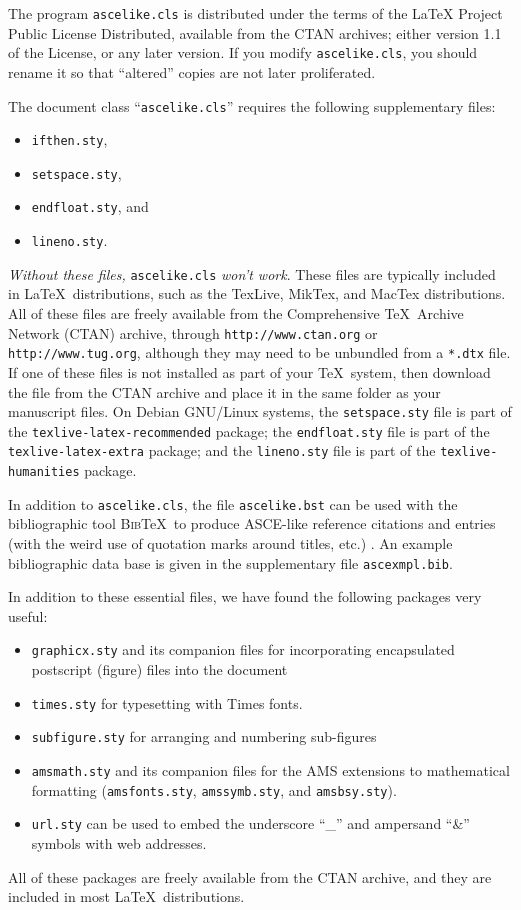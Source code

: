 \documentclass[Proceedings]{ascelike}
\begin{document}
\par
The program \texttt{ascelike.cls} is distributed under the
terms of the LaTeX Project Public License Distributed,
available from the CTAN archives;
either version 1.1 of the License, or any later version.
If you modify
\texttt{ascelike.cls}, you should rename it so that ``altered''
copies are not later proliferated.
\par
The document class ``\texttt{ascelike.cls}'' requires the following
supplementary files:
\begin{itemize}
\item
\texttt{ifthen.sty}, 
\item
\texttt{setspace.sty}, 
\item
\texttt{endfloat.sty}, and 
\item
\texttt{lineno.sty}.
\end{itemize}
\emph{Without these files,} \texttt{ascelike.cls} \emph{won't work}.
These files are typically included in \LaTeX\ distributions, such as the
\textsf{TexLive}, \textsf{MikTex}, and \textsf{MacTex} distributions.
All of these files are freely available
from the Comprehensive \TeX\ Archive Network (CTAN) archive,
through \verb+http://www.ctan.org+ or
\verb+http://www.tug.org+, although they may need to be unbundled from
a \verb+*.dtx+ file.
If one of these files is not installed as part of your \TeX\ system,
then download the file from the CTAN archive and place it in the same folder
as your manuscript files.
On Debian GNU/Linux systems, the \texttt{setspace.sty}
file is part of the \texttt{texlive-latex-re\-com\-mended} package;
the \texttt{endfloat.sty} 
file is part of the \texttt{texlive-latex-extra} package;
and the \texttt{lineno.sty} 
file is part of the \texttt{texlive-humanities} package.
\par
In addition to \texttt{ascelike.cls}, 
the file \texttt{ascelike.bst} can be used with
the bibliographic tool \textsc{Bib}\TeX\ to produce ASCE-like 
reference citations and entries (with the weird use of
quotation marks around titles, etc.) \cite{Kuhn:2011a}.
An example bibliographic data base is given in the
supplementary file \texttt{ascexmpl.bib}.
\par
In addition to these essential files,
we have found the following packages very useful:
%
\begin{itemize}
\item
\texttt{graphicx.sty} and its companion files for incorporating
encapsulated post\-script (figure) files into the document
\item
\texttt{times.sty} for typesetting with Times fonts.
\item
\texttt{subfigure.sty} for arranging and numbering sub-figures
\item
\texttt{amsmath.sty} and its companion files for the AMS extensions
to mathematical formatting (\texttt{amsfonts.sty}, \texttt{amssymb.sty},
and \texttt{amsbsy.sty}).
\item
\texttt{url.sty} can be used to embed the underscore ``\_'' and
ampersand ``\&'' symbols with web addresses.
\end{itemize}
%
All of these packages are freely 
available from the CTAN archive, 
and they are included in most \LaTeX\ distributions.
%
\end{document}
